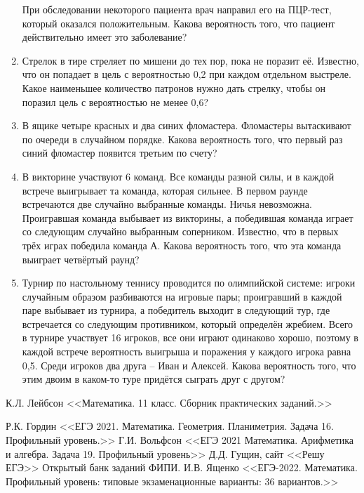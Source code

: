 \documentclass[12pt]{article}
\begin{document}
\begin{enumerate}[start=1,label={\itshape\bfseries \arabic*.}]
        При обследовании некоторого пациента врач направил его на ПЦР-тест, который оказался положительным. Какова вероятность того, что пациент действительно имеет это заболевание?
        \item Стрелок в тире стреляет по мишени до тех пор, пока не поразит её. Известно, что он попадает в цель с вероятностью 0,2 при каждом отдельном выстреле. Какое наименьшее количество патронов нужно дать стрелку, чтобы он поразил цель с вероятностью не менее 0,6?
        \item В ящике четыре красных и два синих фломастера. Фломастеры вытаскивают по очереди в случайном порядке. Какова вероятность того, что первый раз синий фломастер появится третьим по счету?
        \item В викторине участвуют 6 команд. Все команды разной силы, и в каждой встрече выигрывает та команда, которая сильнее. В первом раунде встречаются две случайно выбранные команды. Ничья невозможна. Проигравшая команда выбывает из викторины, а победившая команда играет со следующим случайно выбранным соперником. Известно, что в первых трёх играх победила команда А. Какова вероятность того, что эта команда выиграет четвёртый раунд?
        \item Турнир по настольному теннису проводится по олимпийской системе: игроки случайным образом разбиваются на игровые пары; проигравший в каждой паре выбывает из турнира, а победитель выходит в следующий тур, где встречается со следующим противником, который определён жребием. Всего в турнире участвует 16 игроков, все они играют одинаково хорошо, поэтому в каждой встрече вероятность выигрыша и поражения у каждого игрока равна 0,5. Среди игроков два друга -- Иван и Алексей. Какова вероятность того, что этим двоим в каком-то туре придётся сыграть друг с другом?

 \end{enumerate}
 \newpage
\begin{thebibliography}{99}

К.Л. Лейбсон <<Математика. 11 класс. Сборник практических заданий.>>

Р.К. Гордин <<ЕГЭ 2021. Математика. Геометрия. Планиметрия. Задача 16. Профильный уровень.>>
Г.И. Вольфсон <<ЕГЭ 2021 Математика. Арифметика и алгебра. Задача 19. Профильный уровень>>
Д.Д. Гущин, сайт <<Решу ЕГЭ>>
Открытый банк заданий ФИПИ.
И.В. Ященко <<ЕГЭ-2022. Математика. Профильный уровень: типовые экзаменационные варианты: 36 вариантов.>>
\end{thebibliography}
\end{document}
